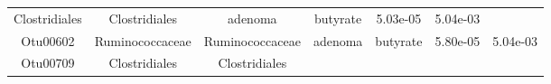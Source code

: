 \documentclass[11pt,]{article}
\begin{document}
\begin{longtable}[]{@{}ccccccc@{}}
\begin{minipage}[t]{0.17\columnwidth}
Clostridiales\strut
\end{minipage} & \begin{minipage}[t]{0.17\columnwidth}\centering\strut
Clostridiales\strut
\end{minipage} & \begin{minipage}[t]{0.09\columnwidth}\centering\strut
adenoma\strut
\end{minipage} & \begin{minipage}[t]{0.11\columnwidth}\centering\strut
butyrate\strut
\end{minipage} & \begin{minipage}[t]{0.09\columnwidth}\centering\strut
5.03e-05\strut
\end{minipage} & \begin{minipage}[t]{0.09\columnwidth}\centering\strut
5.04e-03\strut
\end{minipage}\tabularnewline
\begin{minipage}[t]{0.09\columnwidth}\centering\strut
Otu00602\strut
\end{minipage} & \begin{minipage}[t]{0.17\columnwidth}\centering\strut
Ruminococcaceae\strut
\end{minipage} & \begin{minipage}[t]{0.17\columnwidth}\centering\strut
Ruminococcaceae\strut
\end{minipage} & \begin{minipage}[t]{0.09\columnwidth}\centering\strut
adenoma\strut
\end{minipage} & \begin{minipage}[t]{0.11\columnwidth}\centering\strut
butyrate\strut
\end{minipage} & \begin{minipage}[t]{0.09\columnwidth}\centering\strut
5.80e-05\strut
\end{minipage} & \begin{minipage}[t]{0.09\columnwidth}\centering\strut
5.04e-03\strut
\end{minipage}\tabularnewline
\begin{minipage}[t]{0.09\columnwidth}\centering\strut
Otu00709\strut
\end{minipage} & \begin{minipage}[t]{0.17\columnwidth}\centering\strut
Clostridiales\strut
\end{minipage} & \begin{minipage}[t]{0.17\columnwidth}\centering\strut
Clostridiales\strut
\end{minipage} & \begin{minipage}[t]{0.09\columnwidth}\centering\strut

\end{minipage}
\end{longtable}
\end{document}
